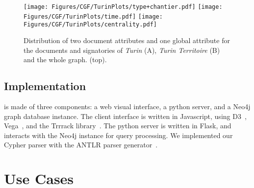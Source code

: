 \begin{figure}
    \centering



    \texttt{[image: Figures/CGF/TurinPlots/type+chantier.pdf]}
    \texttt{[image: Figures/CGF/TurinPlots/time.pdf]}
    \texttt{[image: Figures/CGF/TurinPlots/centrality.pdf]}


    \caption{Distribution of two document attributes and one global attribute for the documents and signatories of \textit{Turin} (A), \textit{Turin Territoire} (B) and the whole graph. (top).}\label{fig:attributeComparison}
\end{figure}


\subsection{Implementation}

\name is made of three components: a web visual interface, a python server, and a Neo4j graph database instance. The client interface is written in Javascript, using D3~\cite{d3}, Vega~\cite{satyanarayan2016vega}, and the Trrrack library~\cite{cutler_trrack_2020}. The python server is written in Flask, and interacts with the Neo4j instance for query processing.
We implemented our Cypher parser with the ANTLR parser generator~\cite{parr1995antlr}.





\section{Use Cases}\label{sec:usecases}

